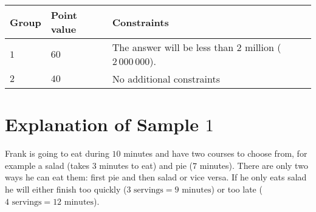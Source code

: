 \noindent
\begin{tabular}{| l | l | p{10cm} |}
    \hline
    \textbf{Group} & \textbf{Point value} & \textbf{Constraints} \\ \hline
    $1$    & $60$        & The answer will be less than $2$ million ($2\,000\,000$). \\ \hline 
    $2$    & $40$        & No additional constraints \\ \hline
\end{tabular}

\section*{Explanation of Sample $1$}
Frank is going to eat during $10$ minutes and have two courses to choose from, for example a salad (takes $3$ minutes to eat) and pie ($7$ minutes).
There are only two ways he can eat them: first pie and then salad or vice versa.
If he only eats salad he will either finish too quickly ($3 \text{ servings} = 9 \text{ minutes}$) or too late ($4 \text{ servings} = 12 \text{ minutes}$).
